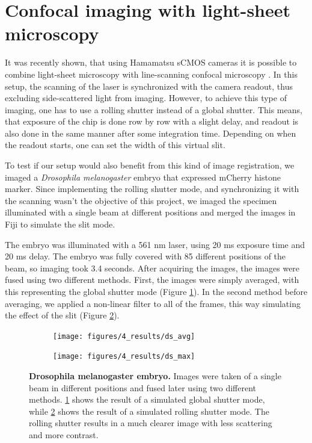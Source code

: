 \documentclass{tdk_style}
\begin{document}
\section{Confocal imaging with light-sheet microscopy}
It was recently shown, that using Hamamatsu sCMOS cameras it is possible to combine light-sheet microscopy with line-scanning confocal microscopy \cite{baumgart_scanned_2012}. In this setup, the scanning of the laser is synchronized with the camera readout, thus excluding side-scattered light from imaging. However, to achieve this type of imaging, one has to use a rolling shutter instead of a global shutter. This means, that exposure of the chip is done row by row with a slight delay, and readout is also done in the same manner after some integration time. Depending on when the readout starts, one can set the width of this virtual slit.

To test if our setup would also benefit from this kind of image registration, we imaged a \emph{Drosophila melanogaster} embryo that expressed mCherry histone marker. Since implementing the rolling shutter mode, and synchronizing it with the scanning wasn't the objective of this project, we imaged the specimen illuminated with a single beam at different positions and merged the images in Fiji to simulate the slit mode.

The embryo was illuminated with a 561 nm laser, using 20 ms exposure time and 20 ms delay. The embryo was fully covered with 85 different positions of the beam, so imaging took 3.4 seconds. After acquiring the images, the images were fused using two different methods. First, the images were simply averaged, with this representing the global shutter mode (Figure \ref{fig:ds_avg}). In the second method before averaging, we applied a non-linear filter to all of the frames, this way simulating the effect of the slit (Figure \ref{fig:ds_max}).

\begin{figure}[tbp]
	\centering
	\begin{subfigure}[b]{0.49\textwidth}
		\centering
		\texttt{[image: figures/4\_results/ds\_avg]}
		\caption{}
		\label{fig:ds_avg}
	\end{subfigure}
	\begin{subfigure}[b]{0.49\textwidth}
		\centering
		\texttt{[image: figures/4\_results/ds\_max]}
		\caption{}
		\label{fig:ds_max}
	\end{subfigure}
	\caption{\textbf{Drosophila melanogaster embryo.} Images were taken of a single beam in different positions and fused later using two different methods. \ref{fig:ds_avg} shows the result of a simulated global shutter mode, while \ref{fig:ds_max} shows the result of a simulated rolling shutter mode. The rolling shutter results in a much clearer image with less scattering and more contrast.}
	\label{fig:ds}
\end{figure}
\end{document}
